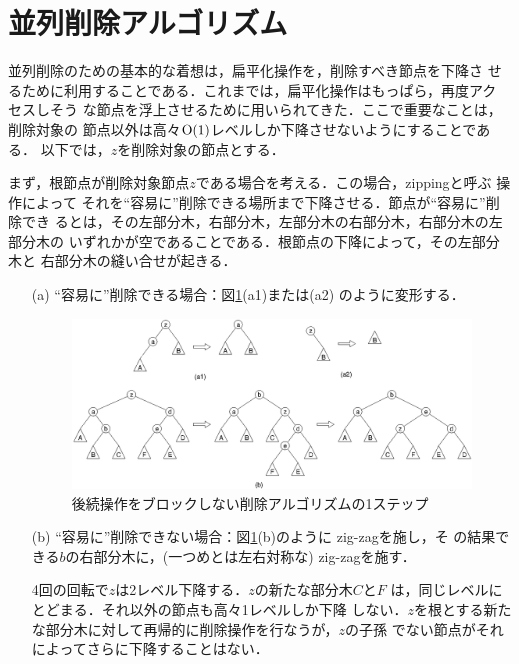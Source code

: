 \documentclass[T]{compsoft}
\begin{document}
\section{並列削除アルゴリズム}\label{section:delete}

並列削除のための基本的な着想は，扁平化操作を，削除すべき節点を下降さ
せるために利用することである．これまでは，扁平化操作はもっぱら，再度アク
セスしそう
な節点を浮上させるために用いられてきた．ここで重要なことは，削除対象の
節点以外は高々${\rm O}(1)$レベルしか下降させないようにすることである．
以下では，$z$を削除対象の節点とする．

まず，根節点が削除対象節点$z$である場合を考える．この場合，zippingと呼ぶ
操作によって
それを``容易に''削除できる場所まで下降させる．節点が``容易に''削除でき
るとは，その左部分木，右部分木，左部分木の右部分木，右部分木の左部分木の
いずれかが空であることである．根節点の下降によって，その左部分木と
右部分木の縫い合せが起きる．
% 

\begin{enumerate}
\item[(a)]
``容易に''削除できる場合：図\ref{figure:delete}(a1)または(a2)
のように変形する．


\begin{figure}[t]
  \centerline {\includegraphics {images/fig4.eps}}
\caption{後続操作をブロックしない削除アルゴリズムの1ステップ}
\label{figure:delete}
\end{figure}

\item[(b)]
``容易に''削除できない場合：図\ref{figure:delete}(b)のように
zig-zagを施し，そ
の結果できる$b$の右部分木に，(一つめとは左右対称な) zig-zagを施す．

\noindent
4回の回転で$z$は2レベル下降する．$z$の新たな部分木$C$と$F$
は，同じレベルにとどまる．それ以外の節点も高々1レベルしか下降
しない．$z$を根とする新たな部分木に対して再帰的に削除操作を行なうが，$z$の子孫
でない節点がそれによってさらに下降することはない．
\end{enumerate}
\end{document}
